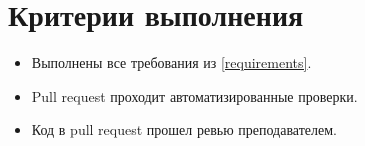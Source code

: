 \documentclass[14pt]{extarticle}
\begin{document}
\section{Критерии выполнения}

    \begin{itemize}

        \item Выполнены все требования из \ref{requirements}.

        \item Pull request проходит автоматизированные проверки.

        \item Код в pull request прошел ревью преподавателем.

    \end{itemize}
\end{document}
